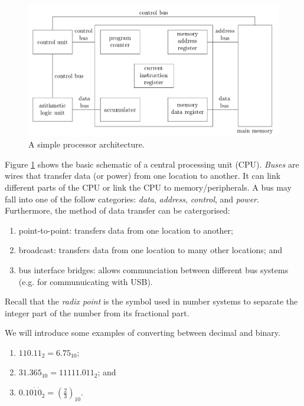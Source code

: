 \begin{figure}
	\centering
	\includegraphics[width=\textwidth]{images/processor-architecture}
	\caption{A simple processor architecture.}
	\label{fig:processor-architecture}
\end{figure}

Figure \ref{fig:processor-architecture} shows the basic schematic of a central
processing unit (CPU). \emph{Buses} are wires that transfer data (or power)
from one location to another. It can link different parts of the CPU
or link the CPU to memory/peripherals.
A bus may fall into one of the follow categories: \emph{data}, \emph{address},
\emph{control}, and \emph{power}.
Furthermore, the method of data transfer can be catergorised:
\begin{enumerate}
	\item point-to-point: transfers data from one location to another;
	\item broadcast: transfers data from one location to many other locations;
		and
	\item bus interface bridges: allows communciation between different bus
		systems (e.g. for communuicating with USB).
\end{enumerate}

Recall that the \emph{radix point} is the symbol used in number systems to
separate the integer part of the number from its fractional part.

We will introduce some examples of converting between decimal and binary.

\begin{examples}
	\begin{enumerate}
		\item $110.11_2 = 6.75_{10}$;
		\item $31.365_{10} = 11111.011_2$; and
		\item $0.10\dot1\dot0_2 = \left(\frac23\right)_{10}$.
	\end{enumerate}
\end{examples}

